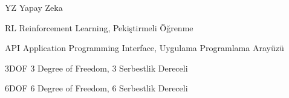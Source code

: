 \begin{simge}
	\item [YZ]   Yapay Zeka
	\item [RL]   Reinforcement Learning, Pekiştirmeli Öğrenme
	\item [API]  Application Programming Interface, Uygulama Programlama Arayüzü
	\item [3DOF] 3 Degree of Freedom, 3 Serbestlik Dereceli
	\item [6DOF] 6 Degree of Freedom, 6 Serbestlik Dereceli
\end{simge}

